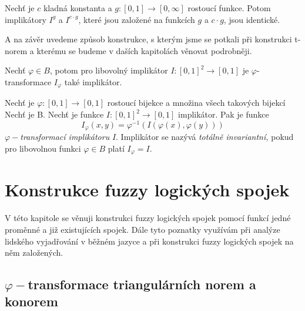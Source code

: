 \begin{sentence} \cite{habilitace}
    Nech\v t je $c$ kladn\'a konstanta a $g:[0,1] \to [0,\infty]$
    rostoucí  funkce. Potom implik\'atory $I^g$ a $I^{c \cdot g}$,
    které jsou zalo\v zen\'e na  funkcích $g$ a $c \cdot g$, jsou
    identick\'e.
\end{sentence}
A na z\'av\v er uvedeme zp\r usob konstrukce, s kter\'ym jsme se potkali p\v ri konstrukci t-norem a kter\'emu se budeme v da\v s\'ich kapitol\'ach v\v enovat podrobn\v eji.
\begin{sentence}\cite{Springer}
    Nech\v t $\varphi \in B$, potom pro libovolný implikátor $I: [0,1]^2 \rightarrow [0,1]$ je $\varphi$-transformace $I_\varphi$ také implikátor.
\end{sentence}

\begin{definition}\cite{Springer}
    Nech\v t je $\varphi:[0,1] \rightarrow [0,1]$  rostoucí
    bijekce a množina všech takových bijekcí Nech\v t je B. Nech\v t je funkce
    $I:[0,1]^2\rightarrow [0,1]$ 
    implikátor.
    Pak je funkce
    $$I_\varphi(x,y)=\varphi^{-1}(I(\varphi (x), \varphi (y)))$$
    $\varphi-${\em transformací implikátoru} $I.$ Implikátor se nazývá
    {\em totálně invariantní,} pokud pro libovolnou funkci $\varphi \in B$ platí $I_\varphi=I.$\\
\end{definition}

\section{Konstrukce fuzzy logick\'ych spojek}

V této kapitole se věnuji konstrukci fuzzy logických spojek pomocí funkcí jedné proměnné a již existujících spojek. Dále tyto poznatky využívám při analýze lidského vyjadřování v běžném jazyce a při konstrukci fuzzy logických spojek na něm založených.

\subsection{$\varphi-$transformace triangulárních norem a konorem}

